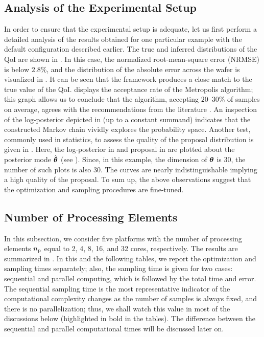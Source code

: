 \subsection{Analysis of the Experimental Setup}



In order to ensure that the experimental setup is adequate, let us first perform a detailed analysis of the results obtained for one particular example with the default configuration described earlier.
The true and inferred distributions of the QoI are shown in . In this case, the normalized root-mean-square error (NRMSE) is below $2.8\%$, and the distribution of the absolute error across the wafer is visualized in . It can be seen that the framework produces a close match to the true value of the QoI.
 displays the acceptance rate of the Metropolis algorithm; this graph allows us to conclude that the algorithm, accepting $20$--$30\%$ of samples on average, agrees with the recommendations from the literature \cite{gelman2004}.
An inspection of the log-posterior depicted in  (up to a constant summand) indicates that the constructed Markov chain vividly explores the probability space.
Another test, commonly used in statistics, to assess the quality of the proposal distribution is given in . Here, the log-posterior in  and proposal in  are plotted about the posterior mode $\hat{{\boldsymbol\theta}}$ (see ).
Since, in this example, the dimension of ${\boldsymbol\theta}$ is 30, the number of such plots is also 30. The curves are nearly indistinguishable implying a high quality of the proposal. To sum up, the above observations suggest that the optimization and sampling procedures are fine-tuned.

\subsection{Number of Processing Elements}
In this subsection, we consider five platforms with the number of processing elements ${n_\text{p}}$ equal to 2, 4, 8, 16, and 32 cores, respectively. The results are summarized in .
In this and the following tables, we report the optimization and sampling times separately; also, the sampling time is given for two cases: sequential and parallel computing, which is followed by the total time and error.
The sequential sampling time is the most representative indicator of the computational complexity changes as the number of samples is always fixed, and there is no parallelization; thus, we shall watch this value in most of the discussions below (highlighted in bold in the tables). The difference between the sequential and parallel computational times will be discussed later on.


